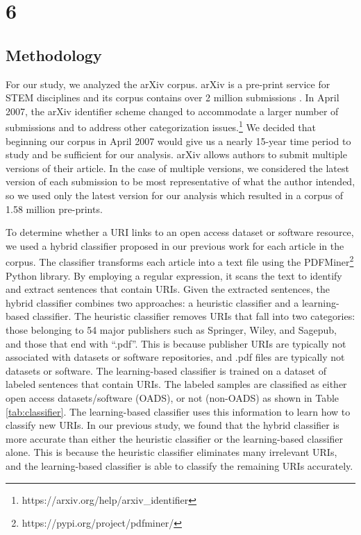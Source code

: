 \chapter{6}
\label{ch:6}

\section{Methodology}
For our study, we analyzed the arXiv corpus. arXiv is a pre-print service for STEM disciplines and its corpus contains over 2 million submissions \cite{fromme-cornell2022}. In April 2007, the arXiv identifier scheme changed to accommodate a larger number of submissions and to address other categorization issues.\footnote{https://arxiv.org/help/arxiv\_identifier} We decided that beginning our corpus in April 2007 would give us a nearly 15-year time period to study and be sufficient for our analysis. arXiv allows authors to submit multiple versions of their article. In the case of multiple versions, we considered the latest version of each submission to be most representative of what the author intended, so we used only the latest version for our analysis which resulted in a corpus of 1.58 million pre-prints. 

To determine whether a URI links to an open access dataset or software resource, we used a hybrid classifier proposed in our previous work \cite{salsabil2022study} for each article in the corpus. The classifier transforms each article into a text file using the PDFMiner\footnote{https://pypi.org/project/pdfminer/} Python library. By employing a regular expression, it scans the text to identify and extract sentences that contain URIs. Given the extracted sentences, the hybrid classifier combines two approaches: a heuristic classifier and a learning-based classifier. The heuristic classifier removes URIs that fall into two categories: those belonging to 54 major publishers such as Springer, Wiley, and Sagepub, and those that end with ``.pdf''. This is because publisher URIs are typically not associated with datasets or software repositories, and .pdf files are typically not datasets or software. The learning-based classifier is trained on a dataset of labeled sentences that contain URIs. The labeled samples are classified as either open access datasets/software (OADS), or not (non-OADS) as shown in Table \ref{tab:classifier}. The learning-based classifier uses this information to learn how to classify new URIs. In our previous study, we found that the hybrid classifier is more accurate than either the heuristic classifier or the learning-based classifier alone. This is because the heuristic classifier eliminates many irrelevant URIs, and the learning-based classifier is able to classify the remaining URIs accurately.

